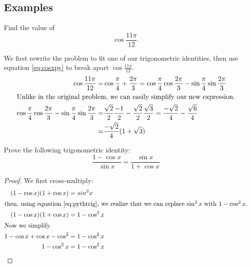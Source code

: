 \subsection{Examples}

\begin{ex}
  Find the value of
  \[ \cos{\frac{11 \pi}{12}} \text{.}\]
  \begin{sol}
    We first rewrite the problem to fit one of our trigonometric identities,
    then use equation \eqref{eq:cosxpy} to break apart \(\cos{\frac{11 \pi}{12}}\).
    \begin{align*}
      \cos{\frac{11 \pi}{12}}
      =&\cos{\frac{\pi}{4}+\frac{2 \pi}{3}}
      =\cos{\frac{\pi}{4}} \cos{\frac{2\pi}{3}}
        -\sin\frac{\pi}{4} \sin\frac{2\pi}{3} \\
      \intertext{Unlike in the original problem, we can easily simplify our new expression.}
      \cos{\frac{\pi}{4}} \cos{\frac{2\pi}{3}}
        - \sin{\frac{\pi}{4}} \sin{\frac{2\pi}{3}}
      =& \frac{\sqrt 2}{2} \frac{-1}{2}
        -\frac{\sqrt 2}{2} \frac{\sqrt 3}{2}
      =\frac{-\sqrt 2}{4}
        - \frac{\sqrt{6}}{4} \\
      = &\frac{-\sqrt 2}{4}(1+\sqrt 3)
    \end{align*}
  \end{sol}
\end{ex}
\begin{ex}
  Prove the following trigonometric identity:
  \[ \frac{1-\cos x}{\sin x}=\frac{\sin x}{1+\cos x} \]
  \begin{proof}
    We first cross-multiply:
    \begin{align*}
      \ (1-\cos x)(1+\cos x) &= sin^2 x \\
      \intertext{then, using equation \eqref{eq:pythtrig}, we realize that we can replace \(\sin^2 x\) with \(1-\cos^2 x\).}
       (1-\cos x)(1+\cos x) &= 1-\cos^2x\\
      \intertext{Now we simplify.}
      1-\cos x + \cos x -\cos^2 &= 1-\cos^2x \\
      1-\cos^2x &= 1-\cos^2x \qedhere
    \end{align*}
  \end{proof}
\end{ex}
